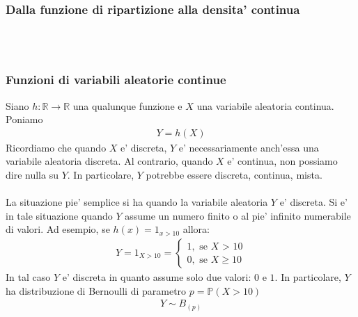 \documentclass[a4paper,12pt]{article}
\begin{document}
\subsubsection{Dalla funzione di ripartizione alla densita' continua}
\\
\vspace{1px}\\
\subsubsection{Funzioni di variabili aleatorie continue}
Siano $h : \mathbb{R} \to \mathbb{R}$ una qualunque funzione e $X$ una variabile aleatoria continua. Poniamo
\begin{align*}
  Y = h(X)
\end{align*}
Ricordiamo che quando $X$ e' discreta, $Y$ e' necessariamente anch’essa una variabile aleatoria discreta. Al contrario, quando $X$ e' continua, non possiamo dire nulla su $Y$. In particolare, $Y$ potrebbe essere discreta, continua, mista.\\
\vspace{5px}\\
La situazione pie' semplice si ha quando la variabile aleatoria $Y$ e' discreta. Si e' in tale
situazione quando $Y$ assume un numero finito o al pie' infinito numerabile di valori. Ad
esempio, se $h(x) = 1_{x>10}$ allora:
\begin{align*}
  Y = 1_{X > 10} = \begin{cases}
    1, \text{ se $X$ > 10}\\
    0, \text{ se $X \geq 10$}
  \end{cases}
\end{align*}
In tal caso $Y$ e' discreta in quanto assume solo due valori: $0$ e $1$. In particolare, $Y$ ha distribuzione di Bernoulli di parametro $p = \mathbb{P}(X > 10)$
\begin{align*}
  Y \sim B_(p)
\end{align*}
\end{document}
